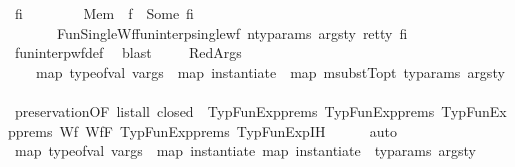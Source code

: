 \begin{isabellebody}
\ fi\ \isanewline
\ \ \ \ \ \ \ Mem{\isacharcolon}{\kern0pt}\ {\isachardoublequoteopen}{\isasymGamma}\ f\ {\isacharequal}{\kern0pt}\ Some\ fi{\isachardoublequoteclose}\ \isanewline
\ \ \ \ \ \ \ FunSingleWf{\isacharcolon}{\kern0pt}{\isachardoublequoteopen}fun{\isacharunderscore}{\kern0pt}interp{\isacharunderscore}{\kern0pt}single{\isacharunderscore}{\kern0pt}wf\ {\isacharparenleft}{\kern0pt}n{\isacharunderscore}{\kern0pt}ty{\isacharunderscore}{\kern0pt}params{\isacharcomma}{\kern0pt}\ args{\isacharunderscore}{\kern0pt}ty{\isacharcomma}{\kern0pt}\ ret{\isacharunderscore}{\kern0pt}ty{\isacharparenright}{\kern0pt}\ fi{\isachardoublequoteclose}\isanewline
\ \ \ \ \isamarkupfalse%
\ fun{\isacharunderscore}{\kern0pt}interp{\isacharunderscore}{\kern0pt}wf{\isacharunderscore}{\kern0pt}def\ \isamarkupfalse%
\ blast\ \isanewline
\ \ \isamarkupfalse%
\ RedArgs\ \isamarkupfalse%
\ \isanewline
\ \ \ \ {\isachardoublequoteopen}map\ {\isacharparenleft}{\kern0pt}type{\isacharunderscore}{\kern0pt}of{\isacharunderscore}{\kern0pt}val{\isacharparenright}{\kern0pt}\ vargs\ {\isacharequal}{\kern0pt}\ map\ {\isacharparenleft}{\kern0pt}instantiate\ {\isasymOmega}{\isacharparenright}{\kern0pt}\ {\isacharparenleft}{\kern0pt}map\ {\isacharparenleft}{\kern0pt}msubstT{\isacharunderscore}{\kern0pt}opt\ ty{\isacharunderscore}{\kern0pt}params{\isacharparenright}{\kern0pt}\ args{\isacharunderscore}{\kern0pt}ty{\isacharparenright}{\kern0pt}{\isachardoublequoteclose}\isanewline
\ \ \ \ \isamarkupfalse%
\ preservation{\isacharparenleft}{\kern0pt}{}{\isacharparenright}{\kern0pt}{\isacharbrackleft}{\kern0pt}OF\ {\isacartoucheopen}list{\isacharunderscore}{\kern0pt}all\ closed\ {\isasymOmega}{\isacartoucheclose}\ TypFunExp{\isachardot}{\kern0pt}prems{\isacharparenleft}{\kern0pt}{}{\isacharparenright}{\kern0pt}\ TypFunExp{\isachardot}{\kern0pt}prems{\isacharparenleft}{\kern0pt}{}{\isacharparenright}{\kern0pt}\ TypFunExp{\isachardot}{\kern0pt}prems{\isacharparenleft}{\kern0pt}{}{\isacharparenright}{\kern0pt}\ Wf{\isacharunderscore}{\kern0pt}{\isasymGamma}\ Wf{\isacharunderscore}{\kern0pt}F{\isacharbrackright}{\kern0pt}\ TypFunExp{\isachardot}{\kern0pt}prems\ TypFunExp{\isachardot}{\kern0pt}IH\isanewline
\ \ \ \ \isamarkupfalse%
\ auto\ \ \ \ \isanewline
\ \ \isamarkupfalse%
\ {\isachardoublequoteopen}map\ {\isacharparenleft}{\kern0pt}type{\isacharunderscore}{\kern0pt}of{\isacharunderscore}{\kern0pt}val{\isacharparenright}{\kern0pt}\ vargs\ {\isacharequal}{\kern0pt}\ map\ {\isacharparenleft}{\kern0pt}instantiate\ {\isacharparenleft}{\kern0pt}map\ {\isacharparenleft}{\kern0pt}instantiate\ {\isasymOmega}{\isacharparenright}{\kern0pt}\ ty{\isacharunderscore}{\kern0pt}params{\isacharparenright}{\kern0pt}{\isacharparenright}{\kern0pt}\ args{\isacharunderscore}{\kern0pt}ty{\isachardoublequoteclose}\ \ \ \ \ \isanewline

\end{isabellebody}
